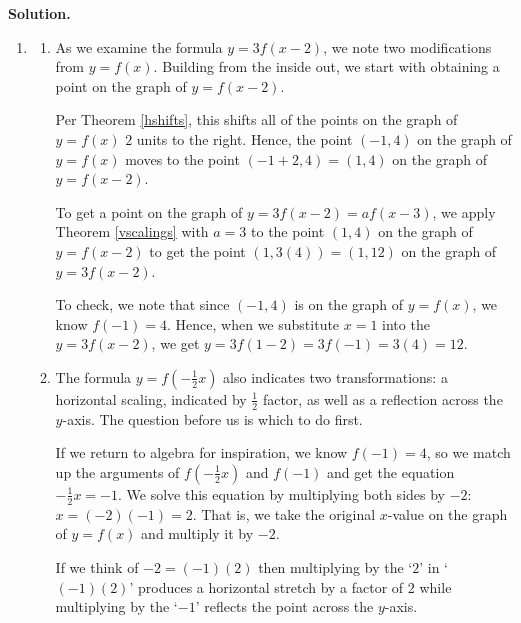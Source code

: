 \documentclass{ximera}
\begin{document}
\begin{example}
 {\bf Solution.}
 
 \begin{enumerate}
 
 \item  
 
 \begin{enumerate}
 
 \item  As we examine the formula  $y = 3f(x-2)$, we note two modifications from $y=f(x)$.  Building from the inside out, we start with obtaining a point on the graph of $y=f(x-2)$. 
 
 \smallskip
 
 Per Theorem \ref{hshifts}, this shifts all of the points on the graph of $y=f(x)$ $2$ units to the right.  Hence, the point $(-1,4)$ on the graph of $y=f(x)$ moves to the point $(-1+2, 4) = (1,4)$  on the graph of $y=f(x-2)$.  
 
 \smallskip
 
 To get a point on the graph of $y = 3f(x-2) = a f(x-3)$, we apply Theorem \ref{vscalings} with $a=3$ to the point $(1,4)$ on the graph of $y=f(x-2)$ to  get the point $(1,3(4)) = (1,12)$ on the graph of $y=3f(x-2)$.  
 
 \smallskip
 
 To check, we note that since $(-1,4)$ is on the graph of $y=f(x)$, we know $f(-1)=4$.  Hence, when we substitute $x=1$ into the $y=3f(x-2)$, we get $y=3f(1-2) = 3f(-1) = 3(4) = 12$.
 
 \item The formula $y = f\left(-\frac{1}{2} x \right)$ also indicates two transformations:  a horizontal scaling, indicated by $\frac{1}{2}$ factor, as well as a reflection across the $y$-axis.  The question before us is which to do first. 
 
 \smallskip
 
  If we return to algebra for inspiration, we know $f(-1) = 4$, so we match up the arguments of $f\left(-\frac{1}{2} x \right)$ and $f(-1)$ and get the equation $-\frac{1}{2} x  = -1$. We solve this equation by multiplying both sides by $-2$:  $x = (-2)(-1) = 2$.  That is, we take the original $x$-value on the graph of $y=f(x)$ and multiply it by $-2$.  
  
  \smallskip
  
  If we think of $-2= (-1)(2)$ then multiplying by the `$2$' in `$(-1)(2)$' produces a horizontal stretch by a factor of $2$ while multiplying by the `$-1$'  reflects the point across the $y$-axis. 
  

\end{enumerate}
\end{enumerate}
\end{example}
\end{document}
